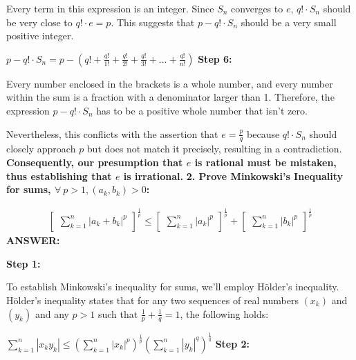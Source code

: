 \documentclass{article}
\begin{document}
\begin{flushleft}
Every term in this expression is an integer. Since $S_n$ converges to $e$, $q! \cdot S_n$ should be very close to $q! \cdot e = p$. This suggests that $p - q! \cdot S_n$ should be a very small positive integer.

$ p - q! \cdot S_n = p - (q! + \frac{q!}{1!} + \frac{q!}{2!} + \frac{q!}{3!} + \ldots + \frac{q!}{n!}) $
\newline\newline
\textbf{Step 6:}

Every number enclosed in the brackets is a whole number, and every number within the sum is a fraction with a denominator larger than 1. Therefore, the expression $p - q! \cdot S_n$ has to be a positive whole number that isn't zero.

Nevertheless, this conflicts with the assertion that $e = \frac{p}{q}$ because $q! \cdot S_n$ should closely approach $p$ but does not match it precisely, resulting in a contradiction.
\newline\newline
\textbf{Consequently, our presumption that $e$ is rational must be mistaken, thus establishing that $e$ is irrational.}
\newline\newline
\textbf{2. Prove Minkowski's Inequality for sums, $\forall \ p>1, (a_k, b_k)>0$:}

\begin{gather}
\begin{bmatrix}
\sum_{k=1}^n |a_k + b_k|^p
\end{bmatrix}^\frac{1}{p}
\leq
\begin{bmatrix}
\sum_{k=1}^n |a_k|^p
\end{bmatrix}^\frac{1}{p}
+
\begin{bmatrix}
\sum_{k=1}^n |b_k|^p
\end{bmatrix}^\frac{1}{p}
\end{gather}
\newline\newline
\textbf{ANSWER:}

\textbf{Step 1:}

To establish Minkowski's inequality for sums, we'll employ Hölder's inequality. Hölder's inequality states that for any two sequences of real numbers $(x_k)$ and $(y_k)$ and any $p>1$ such that $\frac{1}{p} + \frac{1}{q} = 1$, the following holds:

$\sum_{k=1}^n |x_k y_k| \leq \left( \sum_{k=1}^n |x_k|^p \right)^{\frac{1}{p}} \left( \sum_{k=1}^n |y_k|^q \right)^{\frac{1}{q}}$
\newline\newline
\textbf{Step 2:}


\end{flushleft}
\end{document}
